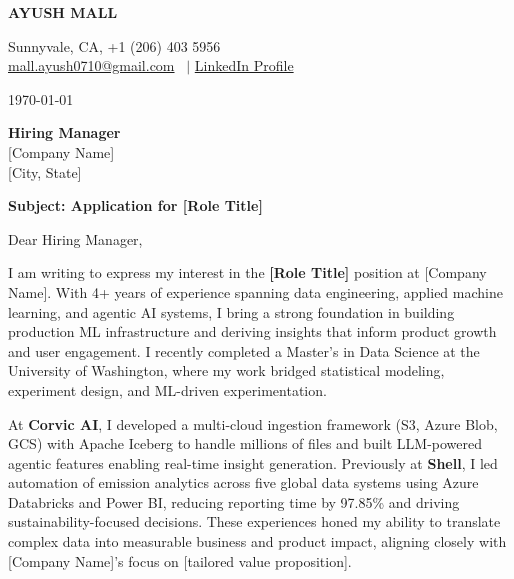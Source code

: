 \documentclass[10pt,a4paper]{article}
\begin{document}

\noindent
\begin{minipage}[c]{0.65\textwidth} %
    \vspace{0pt}
    {\LARGE \textbf{AYUSH MALL}}
\end{minipage}%
\begin{minipage}[c]{0.35\textwidth} %
    \raggedleft
    Sunnyvale, CA, +1 (206) 403 5956 \\
    \href{mailto:mall.ayush0710@gmail.com}{mall.ayush0710@gmail.com} \ $|$ \href{https://www.linkedin.com/in/ayush-mall}{LinkedIn Profile}
\end{minipage}

\vspace{0.2em}

\noindent \today

\vspace{0.5em}

\noindent
\textbf{Hiring Manager} \\
{[Company Name]} \\
{[City, State]}

\vspace{1em}

\noindent
\textbf{Subject: Application for {[Role Title]}}

\vspace{1em}

Dear Hiring Manager,

I am writing to express my interest in the \textbf{[Role Title]} position at {[Company Name]}. With 4+ years of experience spanning data engineering, applied machine learning, and agentic AI systems, I bring a strong foundation in building production ML infrastructure and deriving insights that inform product growth and user engagement. I recently completed a Master's in Data Science at the University of Washington, where my work bridged statistical modeling, experiment design, and ML-driven experimentation.

At \textbf{Corvic AI}, I developed a multi-cloud ingestion framework (S3, Azure Blob, GCS) with Apache Iceberg to handle millions of files and built LLM-powered agentic features enabling real-time insight generation. Previously at \textbf{Shell}, I led automation of emission analytics across five global data systems using Azure Databricks and Power BI, reducing reporting time by 97.85\% and driving sustainability-focused decisions. These experiences honed my ability to translate complex data into measurable business and product impact, aligning closely with {[Company Name]}'s focus on {[tailored value proposition]}.
\end{document}

